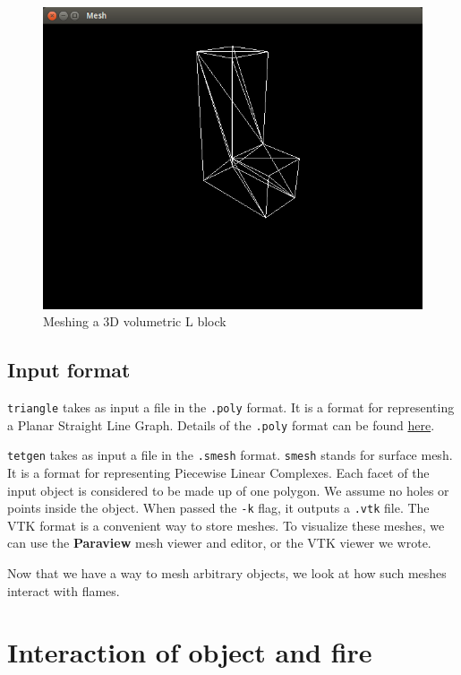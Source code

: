 \documentclass[12pt]{report}
\begin{document}
\begin{figure}[H]
\centering
\includegraphics[width=\linewidth]{img/lmesh}
\caption{Meshing a 3D volumetric L block}
\label{fig:lmesh}
\end{figure}

\section{Input format}

\texttt{triangle} takes as input a file in the \texttt{.poly} format. It is a format for representing a Planar Straight Line Graph. Details of the \texttt{.poly} format can be found \href{http://www.cs.cmu.edu/~quake/triangle.poly.html}{here}.

\texttt{tetgen} takes as input a file in the \texttt{.smesh} format. \texttt{smesh} stands for surface mesh. It is a format for representing Piecewise Linear Complexes. Each facet of the input object is considered to be made up of one polygon. We assume no holes or points inside the object. When passed the \texttt{-k} flag, it outputs a \texttt{.vtk} file. The VTK format is a convenient way to store meshes. To visualize these meshes, we can use the \textbf{Paraview} mesh viewer and editor, or the VTK viewer we wrote.

Now that we have a way to mesh arbitrary objects, we look at how such meshes interact with flames.

\chapter{Interaction of object and fire}
\end{document}
